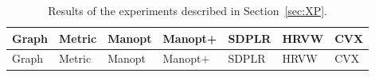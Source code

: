 \documentclass{article}
\newcommand{\1}{\mathbf{1}}
\begin{document}
\begin{longtable}{lllllll}
	
	\caption{Results of the experiments described in Section~\ref{sec:XP}.}
	\label{tab:maxcutXPrudy} \\
	\ttfamily Graph & \ttfamily Metric & \ttfamily Manopt & \ttfamily Manopt+ & \ttfamily SDPLR & \ttfamily HRVW & \ttfamily CVX \\ \hline
	\endfirsthead
	
	\ttfamily Graph & \ttfamily Metric & \ttfamily Manopt & \ttfamily Manopt+ & \ttfamily SDPLR & \ttfamily HRVW & \ttfamily CVX \\ \hline
	
	\endhead
	
	
	
\end{longtable}


\end{document}
